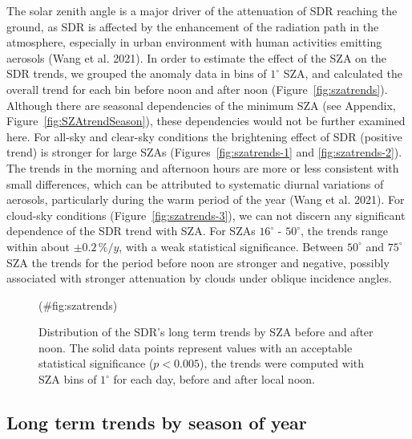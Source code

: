 \documentclass[
  preprint, 3p, authoryear]{article}
\begin{document}
The solar zenith angle is a major driver of the attenuation of SDR reaching the ground, as SDR is affected by the enhancement of the radiation path in the atmosphere, especially in urban environment with human activities emitting aerosols (Wang et al. 2021).
In order to estimate the effect of the SZA on the SDR trends, we grouped the anomaly data in bins of \(1^\circ\) SZA, and calculated the overall trend for each bin before noon and after noon (Figure~\ref{fig:szatrends}).
Although there are seasonal dependencies of the minimum SZA (see Appendix, Figure~\ref{fig:SZAtrendSeason}), these dependencies would not be further examined here.
For all-sky and clear-sky conditions the brightening effect of SDR (positive trend) is stronger for large SZAs (Figures~\ref{fig:szatrends-1} and \ref{fig:szatrends-2}).
The trends in the morning and afternoon hours are more or less consistent with small differences, which can be attributed to systematic diurnal variations of aerosols, particularly during the warm period of the year (Wang et al. 2021).
For cloud-sky conditions (Figure~\ref{fig:szatrends-3}), we can not discern any significant dependence of the SDR trend with SZA.
For SZAs \(16^\circ\) - \(50^\circ\), the trends range within about \(\pm 0.2\,\%/y\), with a weak statistical significance.
Between \(50^\circ\) and \(75^\circ\) SZA the trends for the period before noon are stronger and negative, possibly associated with stronger attenuation by clouds under oblique incidence angles.

\begin{figure}[h!]

{\centering {}

}

\caption{Distribution of the SDR's long term trends by SZA before and after noon. The solid data points represent values with an acceptable statistical significance ($p<0.005$), the trends were computed with SZA bins of $1^\circ$ for each day, before and after local noon.}(\#fig:szatrends)
\end{figure}

\hypertarget{long-term-trends-by-season-of-year}{%
\subsection{Long term trends by season of year}\label{long-term-trends-by-season-of-year}}
\end{document}
